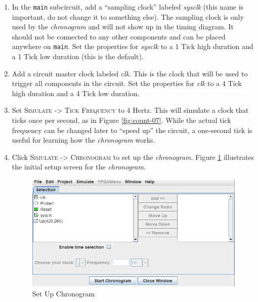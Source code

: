 \begin{enumerate}
	\item In the \lstinline[columns=fixed]|main| subcircuit, add a ``sampling clock'' labeled \textit{sysclk} (this name is important, do not change it to something else). The sampling clock is only used by the \textit{chronogram} and will not show up in the timing diagram. It should not be connected to any other components and can be placed anywhere on \lstinline[columns=fixed]|main|. Set the properties for \textit{sysclk} to a 1 Tick high duration and a 1 Tick low duration (this is the default). 
	\item Add a circuit master clock labeled \textit{clk}. This is the clock that will be used to trigger all components in the circuit. Set the properties for \textit{clk} to a 4 Tick high duration and a 4 Tick low duration.
	\item Set \textsc{Simulate -> Tick Frequency} to 4 Hertz. This will simulate a clock that ticks once per second, as in Figure \ref{fig:count-07}. While the actual tick frequency can be changed later to ``speed up'' the circuit, a one-second tick is useful for learning how the \textit{chronogram} works.
	\item Click \textsc{Simulate -> Chronogram} to set up the \textit{chronogram}. Figure \ref{fig:count-08} illustrates the initial setup screen for the \textit{chronogram}.

	\begin{figure}[H]
		\centering
		\includegraphics[width=\maxwidth{.95\linewidth}]{gfx/count-08}
		\caption{Set Up Chronogram}
		\label{fig:count-08}
	\end{figure}


\end{enumerate}
